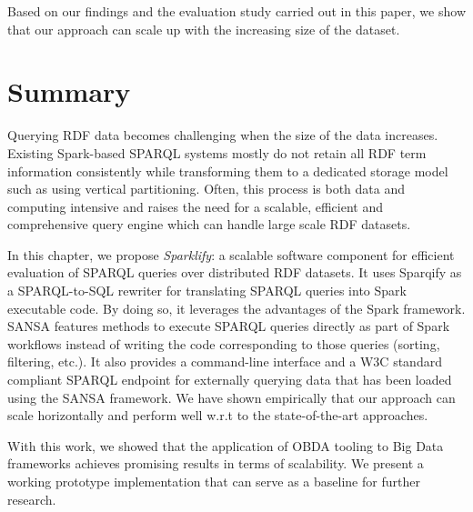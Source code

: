 Based on our findings and the evaluation study carried out in this paper, we show that our approach can scale up with the increasing size of the dataset.

\section{Summary}
\label{sec:scalable-rdf-querying-summary}
Querying RDF data becomes challenging when the size of the data increases.
Existing Spark-based SPARQL systems mostly
do not retain all RDF term information consistently while transforming them to a dedicated storage model such as using vertical partitioning.
Often, this process is both data and computing intensive and raises the need for a scalable, efficient and comprehensive query engine which can handle large scale RDF datasets.

In this chapter, we propose \emph{Sparklify}: a scalable software component for efficient evaluation of SPARQL queries over distributed RDF datasets. 
It uses Sparqify as a SPARQL-to-SQL rewriter for translating SPARQL queries into Spark executable code.
By doing so, it leverages the advantages of the Spark framework.
SANSA features methods to execute SPARQL queries directly as part of Spark workflows instead of writing the code corresponding to those queries (sorting, filtering, etc.).
It also provides a command-line interface and a W3C standard compliant SPARQL endpoint for externally querying data that has been loaded using the SANSA framework.
We have shown empirically that our approach can scale horizontally and perform well w.r.t to the state-of-the-art approaches.

With this work, we showed that the application of OBDA tooling to Big Data frameworks achieves promising results in terms of scalability. 
We present a working prototype implementation that can serve as a baseline for further research. 




